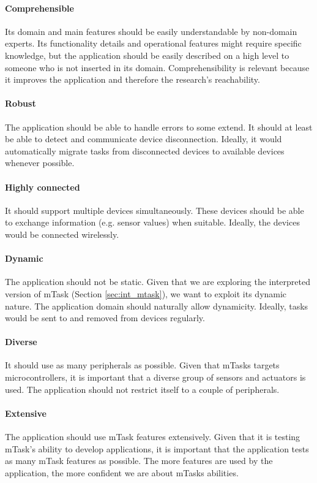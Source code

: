 \paragraph{Comprehensible} Its domain and main features should be easily understandable by non-domain experts. Its functionality details and operational features might require specific knowledge, but the application should be easily described on a high level to someone who is not inserted in its domain. Comprehensibility is relevant because it improves the application and therefore the research's reachability. 

\paragraph{Robust} The application should be able to handle errors to some extend. It should at least be able to detect and communicate device disconnection. Ideally, it would automatically migrate tasks from disconnected devices to available devices whenever possible. 

\paragraph{Highly connected} It should support multiple devices simultaneously. These devices should be able to exchange information (e.g. sensor values) when suitable. Ideally, the devices would be connected wirelessly.

\paragraph{Dynamic} The application should not be static. Given that we are exploring the interpreted version of mTask (Section \ref{sec:int_mtask}), we want to exploit its dynamic nature. The application domain should naturally allow dynamicity. Ideally, tasks would be sent to and removed from devices regularly.

\paragraph{Diverse} It should use as many peripherals as possible. Given that mTasks targets microcontrollers, it is important that a diverse group of sensors and actuators is used. The application should not restrict itself to a couple of peripherals. 

\paragraph{Extensive} The application should use mTask features extensively. Given that it is testing mTask's ability to develop applications, it is important that the application tests as many mTask features as possible. The more features are used by the application, the more confident we are about mTasks abilities.

